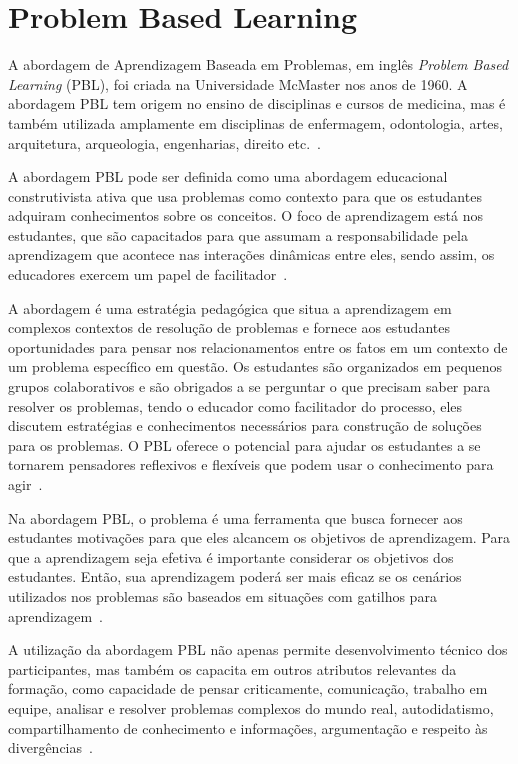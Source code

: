 \section{Problem Based Learning}
\label{sec-revisao-pbl}
A abordagem de Aprendizagem Baseada em Problemas, em
inglês \textit{Problem Based Learning} (PBL),
foi criada na Universidade McMaster nos anos de 1960.
A abordagem \ac{PBL} tem origem no ensino de disciplinas e cursos de medicina,
mas é também utilizada amplamente em disciplinas de enfermagem,
odontologia, artes, arquitetura, arqueologia, engenharias, direito
etc.~\cite{albanese2010problem, amos1998problem}.

A abordagem \ac{PBL} pode ser definida como uma abordagem educacional
construtivista ativa que usa problemas como contexto para que os estudantes
adquiram conhecimentos sobre os conceitos. O foco de aprendizagem está
nos estudantes, que são capacitados para que assumam a responsabilidade pela
aprendizagem que acontece nas interações dinâmicas
entre eles, sendo assim, os educadores exercem um papel
de facilitador~\cite{dolmans2005problem, albanese2010problem,
amos1998problem, forsythe2002problem}.

A abordagem é uma estratégia pedagógica que situa a aprendizagem em
complexos contextos de resolução de problemas e fornece aos estudantes
oportunidades para pensar nos relacionamentos
entre os fatos em um contexto de um problema específico em questão.
Os estudantes são organizados em pequenos grupos colaborativos e 
são obrigados a se perguntar o que precisam saber para
resolver os problemas, tendo o educador como facilitador do processo, eles
discutem estratégias e conhecimentos necessários para construção de soluções
para os problemas.
O \ac{PBL} oferece o potencial para ajudar os estudantes a se tornarem
pensadores reflexivos e flexíveis que podem usar o conhecimento
para agir~\cite{hmelo2004problem}.

Na abordagem \ac{PBL}, o problema é uma ferramenta que busca fornecer
aos estudantes motivações para que eles alcancem os
objetivos de aprendizagem.
Para que a aprendizagem seja efetiva é importante considerar os objetivos
dos estudantes.
Então, sua aprendizagem poderá ser mais eficaz se os cenários utilizados
nos problemas são baseados em situações com gatilhos para
aprendizagem~\cite{wood2003problem, o2012practical, amos1998problem}.

A utilização da abordagem \ac{PBL} não apenas permite desenvolvimento
técnico dos participantes, mas também os capacita em outros
atributos relevantes da formação, como capacidade de pensar
criticamente, comunicação, trabalho em equipe,
analisar e resolver problemas complexos do mundo real,
autodidatismo, compartilhamento de conhecimento e informações,
argumentação e respeito às
divergências~\cite{wood2003problem, savery2015overview}.

